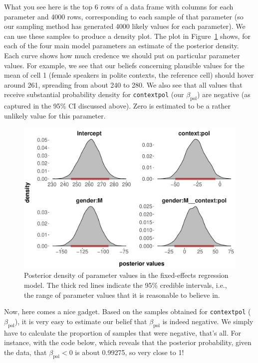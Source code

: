 \documentclass[nobib]{tufte-handout}
\begin{document}
What you see here is the top 6 rows of a data frame with columns for each parameter and 4000 rows, corresponding to each sample of that parameter (so our sampling method has generated 4000 likely values for each parameter).
%
%
We can use these samples to produce a density plot. The plot in Figure~\ref{fig:Posteriors_FE}
shows, for each of the four main model parameters an estimate of the posterior density. Each
curve shows how much credence we should put on particular parameter values. For example, we see
that our beliefs concerning plausible values for the mean of cell 1 (female speakers in polite
contexts, the reference cell) should hover around 261, spreading from about 240 to 280. We also see that all values that receive substantial probability density for \texttt{contextpol} (our $\beta_{\text{pol}}$) are negative (as captured in the 95\% CI discussed above). Zero is estimated to be a rather unlikely value for this parameter.

\begin{figure}
  \centering
  \includegraphics[width=\textwidth]{pics/posterior_density_FE.pdf}
  \caption[Posteriors fixed-effects model]{Posterior density of parameter values in the
    fixed-effects regression model. The thick red lines indicate the 95\% credible intervals,
    i.e., the range of parameter values that it is reasonable to believe in.}
  \label{fig:Posteriors_FE}
\end{figure}

Now, here comes a nice gadget. Based on the samples obtained for \texttt{contextpol} ($\beta_{\text{pol}}$), it is very easy to estimate our belief that $\beta_{\text{pol}}$ is indeed negative. We simply have to calculate the proportion of samples that were negative, that's all. For instance, with the code below, which reveals that the posterior probability, given the data, that $\beta_{\text{pol}} < 0$ is about 0.99275, so very close to 1!  
\end{document}
